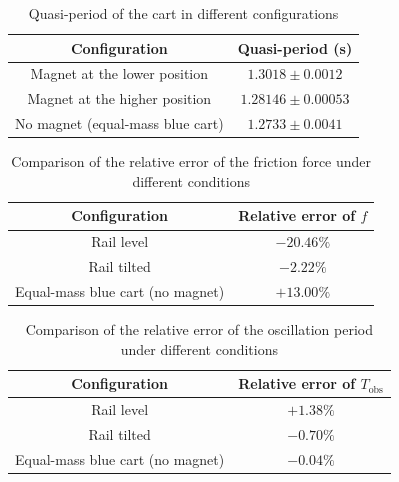 \begin{table}[htb!]
\centering
\caption{Quasi-period of the cart in different configurations}
\begin{tabular}{cc}
\toprule
Configuration & Quasi-period (\unit{\s}) \\
\midrule
Magnet at the lower position & $1.3018 \pm 0.0012$ \\
Magnet at the higher position & $1.28146 \pm 0.00053$ \\
No magnet (equal-mass blue cart) & $1.2733 \pm 0.0041$ \\
\bottomrule
\end{tabular}
\end{table}
\begin{table}[htb!]
\centering
\caption{Comparison of the relative error of the friction force under different conditions}
\begin{tabular}{cc}
\toprule
Configuration & Relative error of $f$ \\
\midrule
Rail level & $-20.46\%$ \\
Rail tilted & $-2.22\%$ \\
Equal-mass blue cart (no magnet) & $+13.00\%$ \\
\bottomrule
\end{tabular}
\end{table}
\begin{table}[htb!]
\centering
\caption{Comparison of the relative error of the oscillation period under different conditions}
\begin{tabular}{cc}
\toprule
Configuration & Relative error of $T_{\text{obs}}$ \\
\midrule
Rail level & $+1.38\%$ \\
Rail tilted & $-0.70\%$ \\
Equal-mass blue cart (no magnet) & $-0.04\%$ \\
\bottomrule
\end{tabular}
\end{table}
